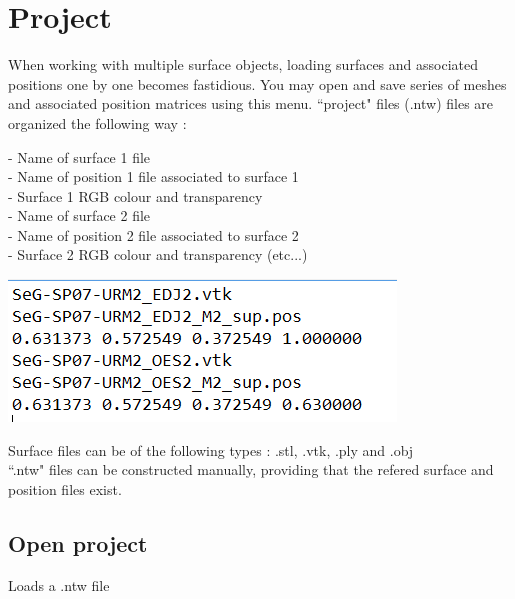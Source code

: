 \section{Project}


When working with multiple surface objects,
loading surfaces and associated positions one
by one becomes fastidious. You may open and
save series of meshes and associated position
matrices using this menu.
``project" files (.ntw) files are organized the
following way :
\begin{minipage}{0.5\textwidth}

- Name of surface 1 file\\
- Name of position 1 file associated to surface 1\\
- Surface 1 RGB colour and transparency\\
- Name of surface 2 file\\
- Name of position 2 file associated to surface 2\\
- Surface 2 RGB colour and transparency (etc...)
\end{minipage}  
\begin{minipage}{0.4\textwidth}\centering
  \includegraphics[scale=0.5]{images/File/Ntw.png}
 \end{minipage} 


Surface files can be of the following types : .stl, .vtk, .ply and .obj\\
``.ntw" files can be constructed manually, providing that the refered surface and position files exist.

\subsection{Open project}
Loads a .ntw file

